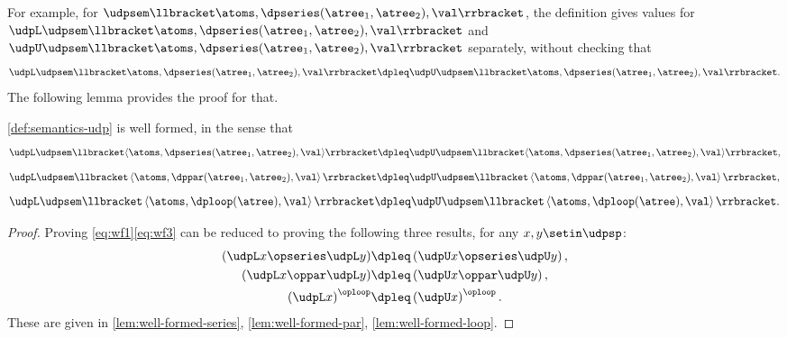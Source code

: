 For example, for $\udpsem\llbracket\atoms,\dpseries(\atree_{1},\atree_{2}),\val\rrbracket$,
the definition gives values for~$\udpL\udpsem\llbracket\atoms,\dpseries(\atree_{1},\atree_{2}),\val\rrbracket$
and~$\udpU\udpsem\llbracket\atoms,\dpseries(\atree_{1},\atree_{2}),\val\rrbracket$
separately, without checking that
\[
    \udpL\udpsem\llbracket\atoms,\dpseries(\atree_{1},\atree_{2}),\val\rrbracket\dpleq\udpU\udpsem\llbracket\atoms,\dpseries(\atree_{1},\atree_{2}),\val\rrbracket.
\]
The following lemma provides the proof for that.
\begin{lemma}
    \label{lem:udpsem-well-formed}\cref{def:semantics-udp} is well
    formed, in the sense that {\small{}
            \begin{equation}
                \udpL\udpsem\llbracket\langle\atoms,\dpseries(\atree_{1},\atree_{2}),\val\rangle\rrbracket\dpleq\udpU\udpsem\llbracket\langle\atoms,\dpseries(\atree_{1},\atree_{2}),\val\rangle\rrbracket,\label{eq:wf1}
            \end{equation}
            \begin{equation}
                \udpL\udpsem\llbracket\left\langle \atoms,\dppar(\atree_{1},\atree_{2}),\val\right\rangle \rrbracket\dpleq\udpU\udpsem\llbracket\left\langle \atoms,\dppar(\atree_{1},\atree_{2}),\val\right\rangle \rrbracket,\label{eq:wf2}
            \end{equation}
            \begin{equation}
                \udpL\udpsem\llbracket\left\langle \atoms,\dploop(\atree),\val\right\rangle \rrbracket\dpleq\udpU\udpsem\llbracket\left\langle \atoms,\dploop(\atree),\val\right\rangle \rrbracket.\label{eq:wf3}
            \end{equation}
        }{\small \par}
\end{lemma}
\begin{proof}
    Proving \cref{eq:wf1}\textemdash \cref{eq:wf3} can be
    reduced to proving the following three results, for any $x,y\setin\udpsp$:
    \begin{align*}
        \left(\udpL x\opseries\udpL y\right) & \dpleq\left(\udpU x\opseries\udpU y\right), \\
        \left(\udpL x\oppar\udpL y\right)    & \dpleq\left(\udpU x\oppar\udpU y\right), \\
        \left(\udpL x\right)^{\oploop}       & \dpleq\left(\udpU x\right)^{\oploop}.
    \end{align*}
    These are given in \cref{lem:well-formed-series}, \cref{lem:well-formed-par},
    \cref{lem:well-formed-loop}.
\end{proof}
